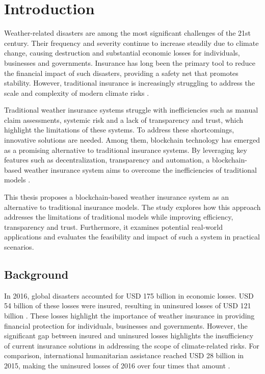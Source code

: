 \chapter{Introduction}\label{chapter:introduction} 
Weather-related disasters are among the most significant challenges of the 21st century. Their frequency and severity continue to increase steadily due to climate change, causing destruction and substantial economic losses for individuals, businesses and governments. Insurance has long been the primary tool to reduce the financial impact of such disasters, providing a safety net that promotes stability. However, traditional insurance is increasingly struggling to address the scale and complexity of modern climate risks \autocites{van2006impacts}{monasterolo2020climate}.

Traditional weather insurance systems struggle with inefficiencies such as manual claim assessments, systemic risk and a lack of transparency and trust, which highlight the limitations of these systems. To address these shortcomings, innovative solutions are needed. Among them, blockchain technology has emerged as a promising alternative to traditional insurance systems. By leveraging key features such as decentralization, transparency and automation, a blockchain-based weather insurance system aims to overcome the inefficiencies of traditional models \autocites{Salem2021Developing}{Omar2023Blockchain-Based}.

This thesis proposes a blockchain-based weather insurance system as an alternative to traditional insurance models. The study explores how this approach addresses the limitations of traditional models while improving efficiency, transparency and trust. Furthermore, it examines potential real-world applications and evaluates the feasibility and impact of such a system in practical scenarios.

\section{Background}\label{section:background}
In 2016, global disasters accounted for USD 175 billion in economic losses. USD 54 billion of these losses were insured, resulting in uninsured losses of USD 121 billion \autocite{swissre2017}. These losses highlight the importance of weather insurance in providing financial protection for individuals, businesses and governments. However, the significant gap between insured and uninsured losses highlights the insufficiency of current insurance solutions in addressing the scope of climate-related risks. For comparison, international humanitarian assistance reached USD 28 billion in 2015, making the uninsured losses of 2016 over four times that amount \autocite{development2016humanitarian}.

